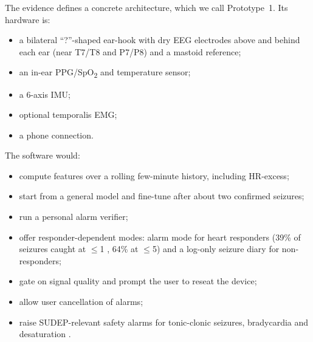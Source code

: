 The evidence defines a concrete architecture, which we call Prototype~1. Its hardware is:
\begin{itemize}
\item a bilateral ``?''-shaped ear-hook with dry EEG electrodes above and behind each ear (near T7/T8 and P7/P8) and a mastoid reference;
\item an in-ear PPG/SpO\textsubscript{2} and temperature sensor;
\item a 6-axis IMU;
\item optional temporalis EMG;
\item a phone connection.
\end{itemize}
The software would:
\begin{itemize}
\item compute features over a rolling few-minute history, including HR-excess;
\item start from a general model and fine-tune after about two confirmed seizures;
\item run a personal alarm verifier;
\item offer responder-dependent modes: alarm mode for heart responders (39\% of seizures caught at $\le$1 \FAd, 64\% at $\le$5) and a log-only seizure diary for non-responders;
\item gate on signal quality and prompt the user to reseat the device;
\item allow user cancellation of alarms;
\item raise SUDEP-relevant safety alarms for tonic-clonic seizures, bradycardia and desaturation \cite{lacuey2018,ryvlin2013}.
\end{itemize}

